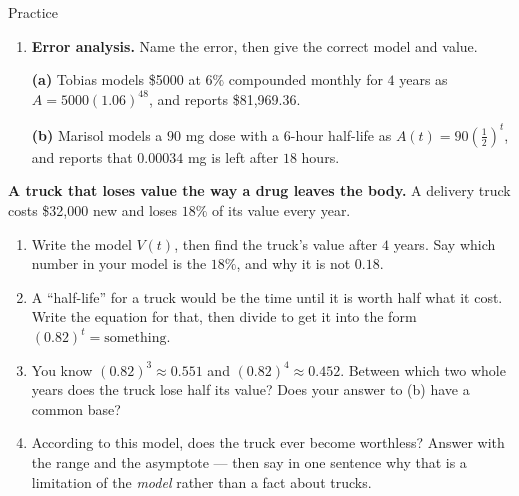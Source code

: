 \documentclass[10pt]{article}
\begin{document}
\begin{notesbox}{Practice}
\begin{enumerate}[leftmargin=1.9em, itemsep=11pt]
  \item \textbf{Error analysis.} Name the error, then give the correct model and value.

    \vspace{2pt}
    \textbf{(a)} Tobias models \$5000 at $6\%$ compounded monthly for $4$ years as
    $A=5000(1.06)^{48}$, and reports \$81{,}969.36. 

    \vspace{2pt}
    \textbf{(b)} Marisol models a $90$ mg dose with a $6$-hour half-life as
    $A(t)=90\left(\frac12\right)^{t}$, and reports that $0.00034$ mg is left after $18$ hours.
\end{enumerate}
\end{notesbox}

\begin{extensionbox}
\textbf{A truck that loses value the way a drug leaves the body.} A delivery truck costs \$32{,}000 new
and loses $18\%$ of its value every year.
\begin{enumerate}[label=(\alph*), leftmargin=1.8em, itemsep=5pt]
  \item Write the model $V(t)$, then find the truck's value after $4$ years. Say which number in your
        model is the $18\%$, and why it is not $0.18$.
  \item A ``half-life'' for a truck would be the time until it is worth half what it cost. Write the
        equation for that, then divide to get it into the form $(0.82)^{t}=\text{something}$.
  \item You know $(0.82)^{3}\approx0.551$ and $(0.82)^{4}\approx0.452$. Between which two whole years
        does the truck lose half its value? Does your answer to (b) have a common base?
  \item According to this model, does the truck ever become worthless? Answer with the range and the
        asymptote --- then say in one sentence why that is a limitation of the \emph{model} rather
        than a fact about trucks.
\end{enumerate}
\end{extensionbox}
\end{document}
